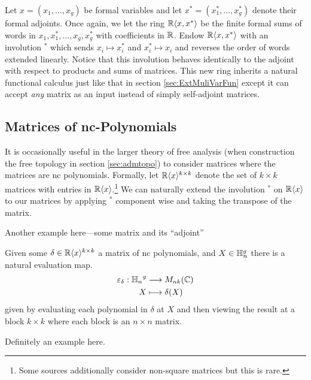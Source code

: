 Let \(x = (x_1, \dots, x_g)\) be formal variables and let
\(x^* = (x_1^*, \dots, x_g^*)\) denote their formal adjoints. Once again, we let
the ring \(\mathbb{R} \langle x,x^* \rangle \) be the finite formal sums of words in
\(x_1,x_1^*, \dots , x_g,x_g^*\) with coefficients in \(\mathbb{R} \). Endow
\(\mathbb{R} \langle x,x^* \rangle \) with an involution \(^*\) which sends
\(x_i \mapsto x_i^*\) and \(x_i^* \mapsto x_i\) and reverses the order of words
extended linearly. Notice that this involution behaves identically to the
adjoint with respect to products and sums of matrices. This new ring inherits a
natural functional calculus just like that in section \ref{sec:ExtMuliVarFun}
except it can accept \emph{any} matrix as an input instead of simply
self-adjoint matrices.

\subsection{Matrices of nc-Polynomials}

It is occasionally useful in the larger theory of free analysis (\eg when
construction the free topology in section \ref{sec:admtopo}) to consider
matrices where the matrices are nc polynomials. Formally,
let \(\mathbb{R} \langle x \rangle ^{k\times k}\) denote the set of \(k \times k\) matrices
with entries in \(\mathbb{R} \langle x \rangle \).\footnote{Some sources additionally
  consider non-square matrices but this is rare.}
We can naturally extend the involution \(^*\) on \(\mathbb{R} \langle x \rangle \) to
our matrices by applying \(^*\) component wise and taking the transpose of the matrix.

{\color{blue} Another example here---some matrix and its ``adjoint''}

Given some \(\delta \in \mathbb{R} \langle x \rangle ^{k \times k}\) a matrix of nc
polynomials, and \(X \in \mathbb{H}_n^g\) there is a natural evaluation map.
\begin{align*}
  \varepsilon_\delta: {\mathbb{H}_n}^g &\longrightarrow M_{nk}(\mathbb{C}) \\
             X &\longmapsto \delta(X)
\end{align*}
given by evaluating each polynomial in \(\delta\) at \(X\) and then viewing the
result at a block \(k \times k\) where each block is an \(n \times n\) matrix.

{\color{blue} Definitely an example here.}
